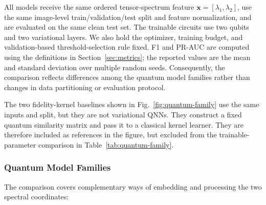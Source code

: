 \documentclass[11pt]{article}
\begin{document}
All models receive the same ordered tensor-spectrum feature
$\boldsymbol{x}=[\lambda_1,\lambda_2]$, use the same image-level train/validation/test
split and feature normalization, and are evaluated on the same clean test set.
The trainable circuits use two qubits and two variational layers.  We also hold
the optimizer, training budget, and validation-based threshold-selection rule
fixed.  F1 and PR-AUC are computed using the definitions in
Section~\ref{sec:metrics}; the reported values are the mean and standard
deviation over multiple random seeds.  Consequently, the comparison reflects
differences among the quantum model families rather than changes in data
partitioning or evaluation protocol.

The two fidelity-kernel baselines shown in Fig.~\ref{fig:quantum-family} use
the same inputs and split, but they are not variational QNNs.  They construct a
fixed quantum similarity matrix and pass it to a classical kernel learner.
They are therefore included as references in the figure, but excluded from the
trainable-parameter comparison in Table~\ref{tab:quantum-family}.

\subsubsection{Quantum Model Families}

The comparison covers complementary ways of embedding and processing the two
spectral coordinates:
\end{document}
